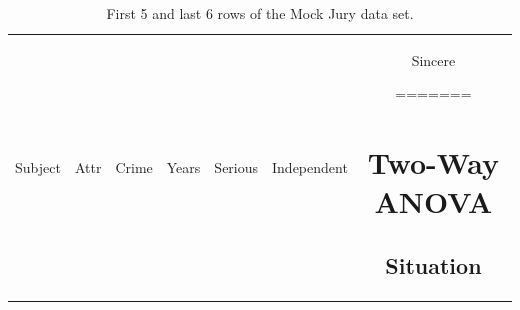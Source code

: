 \documentclass[]{book}
\theoremstyle{definition}
\theoremstyle{definition}
\theoremstyle{remark}
\begin{document}
\begin{longtable}[]{@{}ccccccc@{}}
\caption{\label{tab:Table2-1} First 5 and last 6 rows of the Mock Jury data set.}\tabularnewline
\toprule
\begin{minipage}[b]{0.11\columnwidth}\centering\strut
Subject\strut
\end{minipage} & \begin{minipage}[b]{0.11\columnwidth}\centering\strut
Attr\strut
\end{minipage} & \begin{minipage}[b]{0.10\columnwidth}\centering\strut
Crime\strut
\end{minipage} & \begin{minipage}[b]{0.09\columnwidth}\centering\strut
Years\strut
\end{minipage} & \begin{minipage}[b]{0.11\columnwidth}\centering\strut
Serious\strut
\end{minipage} & \begin{minipage}[b]{0.16\columnwidth}\centering\strut
Independent\strut
\end{minipage} & \begin{minipage}[b]{0.10\columnwidth}\centering\strut
Sincere\strut
=======
\chapter{Two-Way ANOVA}\label{chapter4}

\section{Situation}\label{section4-1}


\end{minipage}
\end{longtable}
\end{document}
